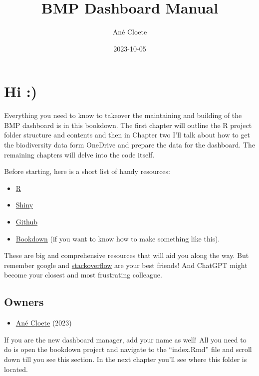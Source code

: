 \documentclass[
]{book}
\title{BMP Dashboard Manual}
\author{Ané Cloete}
\date{2023-10-05}
\providecommand{\tightlist}{%
  \setlength{\itemsep}{0pt}\setlength{\parskip}{0pt}}
\theoremstyle{definition}
\theoremstyle{definition}
\theoremstyle{definition}
\theoremstyle{definition}
\theoremstyle{remark}
\begin{document}
\maketitle

{
\setcounter{tocdepth}{1}
\tableofcontents
}
\hypertarget{hi}{%
\chapter{Hi :)}\label{hi}}

Everything you need to know to takeover the maintaining and building of the BMP dashboard is in this bookdown. The first chapter will outline the R project folder structure and contents and then in Chapter two I'll talk about how to get the biodiversity data form OneDrive and prepare the data for the dashboard. The remaining chapters will delve into the code itself.

Before starting, here is a short list of handy resources:

\begin{itemize}
\tightlist
\item
  \href{https://bookdown.org/yih_huynh/Guide-to-R-Book/}{R}
\item
  \href{https://mastering-shiny.org/}{Shiny}
\item
  \href{https://happygitwithr.com/existing-github-last}{Github}
\item
  \href{https://bookdown.org/yihui/bookdown/get-started.html}{Bookdown} (if you want to know how to make something like this).
\end{itemize}

These are big and comprehensive resources that will aid you along the way. But remember google and \href{https://stackoverflow.com/}{stackoverflow} are your best friends! And ChatGPT might become your closest and most frustrating colleague.

\hypertarget{owners}{%
\section{Owners}\label{owners}}

\begin{itemize}
\tightlist
\item
  \href{https://www.linkedin.com/in/an\%C3\%A9-c-95629ab5/}{Ané Cloete} (2023)
\end{itemize}

If you are the new dashboard manager, add your name as well! All you need to do is open the bookdown project and navigate to the ``index.Rmd'' file and scroll down till you see this section. In the next chapter you'll see where this folder is located.
\end{document}
